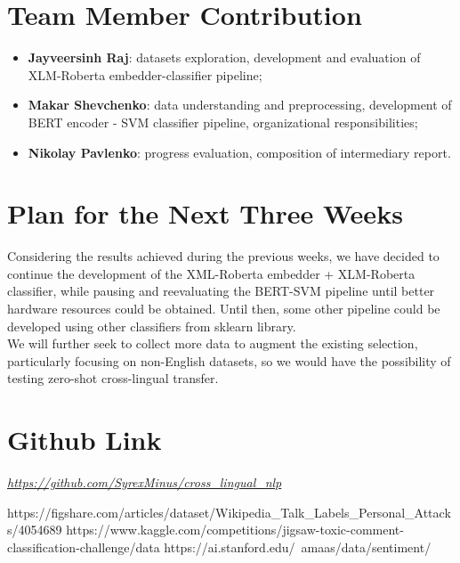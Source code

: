 \documentclass[]{article}
\begin{document}
	\section{Team Member Contribution}
	
	\begin{itemize}
		\item \textbf{Jayveersinh Raj}: datasets exploration, development and evaluation of XLM-Roberta embedder-classifier pipeline;
		\item \textbf{Makar Shevchenko}: data understanding and preprocessing, development of BERT encoder - SVM classifier pipeline, organizational responsibilities;
		\item \textbf{Nikolay Pavlenko}: progress evaluation, composition of intermediary report. 
	\end{itemize}

	\section{Plan for the Next Three Weeks}
	
	Considering the results achieved during the previous weeks, we have decided to continue the development of the XML-Roberta embedder + XLM-Roberta classifier, while pausing and reevaluating the BERT-SVM pipeline until better hardware resources could be obtained. Until then, some other pipeline could be developed using other classifiers from sklearn library. \\
	We will further seek to collect more data to augment the existing selection, particularly focusing on non-English datasets, so we would have the possibility of testing zero-shot cross-lingual transfer.
	
	\section{Github Link}
	\href{https://github.com/SyrexMinus/cross\_lingual\_nlp}{\emph{https://github.com/SyrexMinus/cross\_lingual\_nlp}}
	
	\begin{thebibliography}{9}
		 https://figshare.com/articles/dataset/Wikipedia\_Talk\_Labels\_Personal\_Attacks/4054689
		https://www.kaggle.com/competitions/jigsaw-toxic-comment-classification-challenge/data
		https://ai.stanford.edu/~amaas/data/sentiment/
	\end{thebibliography}
	
\end{document}
